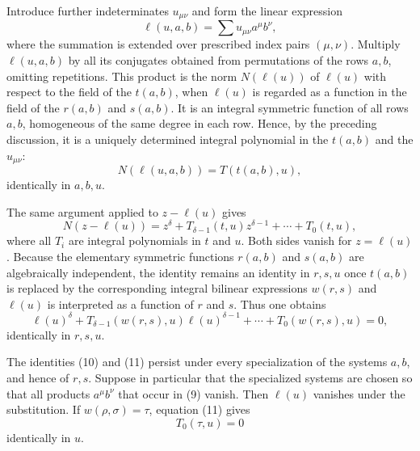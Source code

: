 \documentclass[11pt]{article}
\begin{document}
Introduce further indeterminates $u_{\mu\nu}$ and form the linear expression
\begin{equation}
  \ell(u,a,b)=\sum u_{\mu\nu} a^\mu b^\nu,                         \tag{9}
\end{equation}
where the summation is extended over prescribed index pairs $(\mu,\nu)$. Multiply $\ell(u,a,b)$ by all its conjugates obtained from permutations of the rows $a,b$, omitting repetitions. This product is the norm $N(\ell(u))$ of $\ell(u)$ with respect to the field of the $t(a,b)$, when $\ell(u)$ is regarded as a function in the field of the $r(a,b)$ and $s(a,b)$. It is an integral symmetric function of all rows $a,b$, homogeneous of the same degree in each row. Hence, by the preceding discussion, it is a uniquely determined integral polynomial in the $t(a,b)$ and the $u_{\mu\nu}$:
\begin{equation}
  N(\ell(u,a,b)) = T(t(a,b),u),                                      \tag{10}
\end{equation}
identically in $a,b,u$.

The same argument applied to $z-\ell(u)$ gives
\[
 N(z-\ell(u))=z^\delta+T_{\delta-1}(t,u)z^{\delta-1}+\cdots+T_0(t,u),
\]
where all $T_i$ are integral polynomials in $t$ and $u$. Both sides vanish for $z=\ell(u)$. Because the elementary symmetric functions $r(a,b)$ and $s(a,b)$ are algebraically independent, the identity remains an identity in $r,s,u$ once $t(a,b)$ is replaced by the corresponding integral bilinear expressions $w(r,s)$ and $\ell(u)$ is interpreted as a function of $r$ and $s$. Thus one obtains
\begin{equation}
  \ell(u)^\delta+T_{\delta-1}(w(r,s),u)\ell(u)^{\delta-1}+\cdots+T_0(w(r,s),u)=0,        \tag{11}
\end{equation}
identically in $r,s,u$.

The identities (10) and (11) persist under every specialization of the systems $a,b$, and hence of $r,s$. Suppose in particular that the specialized systems are chosen so that all products $a^\mu b^\nu$ that occur in (9) vanish. Then $\ell(u)$ vanishes under the substitution. If $w(\rho,\sigma)=\tau$, equation (11) gives
\begin{equation}
  T_0(\tau,u)=0                                                    \tag{12}
\end{equation}
identically in $u$.
\end{document}
